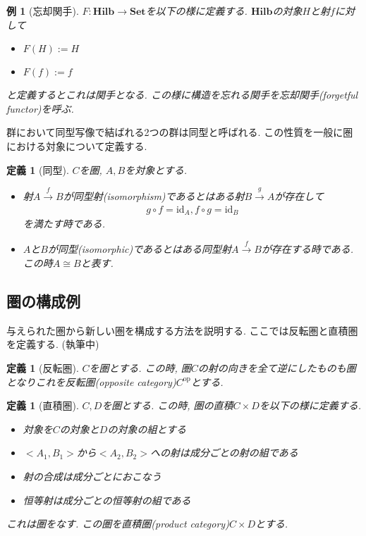 \documentclass[a4paper,12pt]{ltjsarticle}
\theoremstyle{break}
\newtheorem{defn}[thm]{定義}
\newtheorem{eg}[thm]{例}
\newcommand{\cset}{\mathbf{Set}}
\newcommand{\hilb}{\mathbf{Hilb}}
\newcommand{\Op}{\mathrm{op}}
\newcommand{\xr}[1]{\xrightarrow{#1}}
\newcommand{\id}{\mathrm{id}}
\newcommand{\ci}{\circ}
\newcommand{\ti}{\times}
\numberwithin{equation}{section}
\begin{document}
\begin{eg}[忘却関手]
  $F: \hilb \to \cset$を以下の様に定義する. 
  $\hilb$の対象$H$と射$f$に対して
  \begin{itemize}
    \item $F(H):=H$
    \item $F(f):=f$
  \end{itemize}
  と定義するとこれは関手となる. 
  この様に構造を忘れる関手を忘却関手(forgetful functor)を呼ぶ. 
\end{eg}

群において同型写像で結ばれる2つの群は同型と呼ばれる.
この性質を一般に圏における対象について定義する. 

\begin{defn}[同型]
  $C$を圏, $A,B$を対象とする. 
  \begin{itemize}
    \item 射$A \xr{f} B$が同型射(isomorphism)であるとはある射$B \xr{g} A$が存在して
    \begin{align*}
      g \ci f = \id_A, f \ci g = \id_B
    \end{align*}
    を満たす時である. 
    \item $A$と$B$が同型(isomorphic)であるとはある同型射$A \xr{f} B$が存在する時である. 
    この時$A \cong B$と表す. 
  \end{itemize}
\end{defn}

\subsection{圏の構成例}

与えられた圏から新しい圏を構成する方法を説明する. 
ここでは反転圏と直積圏を定義する. (執筆中)

\begin{defn}[反転圏]
  $C$を圏とする. 
  この時, 圏$C$の射の向きを全て逆にしたものも圏となりこれを反転圏(opposite category)$C^\Op$とする. 
\end{defn}

\begin{defn}[直積圏]
  $C,D$を圏とする. 
  この時, 圏の直積$C \ti D$を以下の様に定義する. 
  \begin{itemize}
    \item 対象を$C$の対象と$D$の対象の組とする
    \item $<A_1,B_1>$から$<A_2,B_2>$への射は成分ごとの射の組である
    \item 射の合成は成分ごとにおこなう
    \item 恒等射は成分ごとの恒等射の組である
  \end{itemize}
  これは圏をなす. 
  この圏を直積圏(product category)$C \ti D$とする. 
\end{defn}
\end{document}
